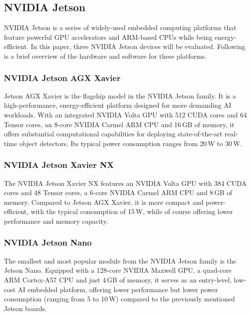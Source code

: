 \subsection{NVIDIA Jetson}
\label{Jetsons}

NVIDIA Jetson is a series of widely-used embedded computing platforms that
feature powerful GPU accelerators and ARM-based CPUs while being
energy-efficient. In this paper, three NVIDIA Jetson devices will be evaluated.
Following is a brief overview of the hardware and software for these platforms.



\subsubsection{NVIDIA Jetson AGX Xavier}

Jetson AGX Xavier is the flagship model in the NVIDIA Jetson family. It is a
high-performance, energy-efficient platform designed for more demanding AI
workloads. With an integrated NVIDIA Volta GPU with 512 CUDA cores and 64 Tensor
cores, an 8-core NVIDIA Carmel ARM CPU and 16\,GB of memory, it offers substantial
computational capabilities for deploying state-of-the-art real-time object
detectors. Its typical power consumption ranges from 20\,W to 30\,W.


\subsubsection{NVIDIA Jetson Xavier NX}

The NVIDIA Jetson Xavier NX features an NVIDIA Volta GPU with 384 CUDA cores and
48 Tensor cores, a 6-core NVIDIA Carmel ARM CPU and 8\,GB of memory. Compared
to Jetson AGX Xavier, it is more compact and power-efficient, with the typical
consumption of 15\,W, while of course offering lower performance and memory
capacity.


\subsubsection{NVIDIA Jetson Nano}

The smallest and most popular module from the NVIDIA Jetson family is the Jetson
Nano. Equipped with a 128-core NVIDIA Maxwell GPU, a quad-core ARM Cortex-A57
CPU and just 4\,GB of memory, it serves as an entry-level, low-cost AI embedded
platform, offering lower performance but lower power consumption (ranging from 5
to 10\,W) compared to the previously mentioned Jetson boards.


